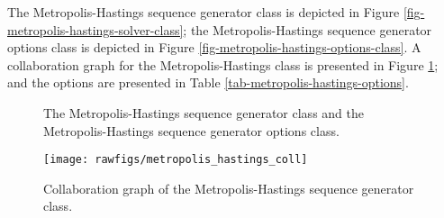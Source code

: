 The Metropolis-Hastings sequence generator class is depicted in Figure \ref{fig-metropolis-hastings-solver-class}; the Metropolis-Hastings sequence generator options class is depicted in Figure \ref{fig-metropolis-hastings-options-class}. A collaboration graph for the Metropolis-Hastings class is presented in Figure \ref{fig-metropolis-hastings-coll}; and the options are presented in Table \ref{tab-metropolis-hastings-options}.



\begin{figure}[htpb]
\centering
{}
\vspace{-.2cm}
\caption{The Metropolis-Hastings sequence generator class and the Metropolis-Hastings sequence generator options class.}
\end{figure}

%


\begin{figure}[p]
\centering
\texttt{[image: rawfigs/metropolis\_hastings\_coll]}
 \vspace{-.8cm}
\caption{Collaboration graph of the  Metropolis-Hastings sequence generator class.}
\label{fig-metropolis-hastings-coll}
\end{figure}

